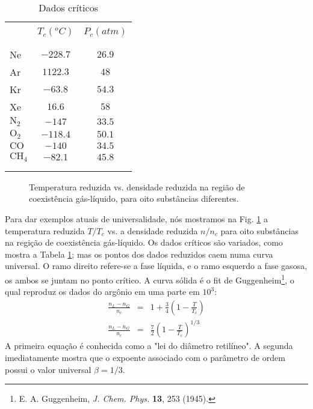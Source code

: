 \begin{table}[h]
\renewcommand{\tablename}{{\bf Tabela}}
\caption{Dados críticos}
\begin{center}
\vspace{0.2cm}
\begin{tabular}{l c c}
\hline
\\[-0.3cm]
 & $T_{c} (^{o}C)$ & $P_{c} (atm)$\\
\\[-0.4cm]
\hline
\\[-0.3cm]
Ne & $-228.7$ & $26.9$\\
Ar & $1122.3$ & $48$\\
Kr & $-63.8$ & $54.3$\\
Xe & $16.6$ & $58$\\
$\text{N}_{2}$ & $-147$ & $33.5$\\
$\text{O}_{2}$ & $-118.4$ & $50.1$\\
$\text{CO}$ & $-140$ & $34.5$\\
$\text{CH}_{4}$ & $-82.1$ & $45.8$\\
\\[-0.3cm]
\hline\\
\end{tabular}
\end{center}
\label{dados_criticos}
\end{table}

\begin{figure}[h]
\begin{center}
\renewcommand{\figurename}{Fig.}
\caption{Temperatura reduzida vs. densidade reduzida na região de coexistência gás-líquido, para oito substâncias diferentes.}
\label{figC16_002}
\end{center}
\end{figure}

Para dar exemplos atuais de universalidade, nós mostramos na Fig. \ref{figC16_002} a temperatura reduzida $T/T_{c}$ vs. a densidade reduzida $n/n_{c}$ para oito substâncias na regição de coexistência gás-líquido. Os dados críticos são variados, como mostra a Tabela \ref{dados_criticos}; mas os pontos dos dados reduzidos caem numa curva universal. O ramo direito refere-se a fase líquida, e o ramo esquerdo a fase gasosa, os ambos se juntam no ponto crítico. A curva sólida é o fit de Guggenheim\footnote{E. A. Guggenheim, {\it J. Chem. Phys.} {\bf 13}, 253 (1945).}, o qual reproduz os dados do argônio em uma parte em $10^{3}$:
\begin{eqnarray}
\frac{n_{L}-n_{G}}{n_{c}}&=&1+\frac{3}{4}\left(1-\frac{T}{T_{c}}\right)
\nonumber \\
\frac{n_{L}-n_{G}}{n_{c}}&=&\frac{7}{2}\left(1-\frac{T}{T_{c}}\right)^{1/3}
\end{eqnarray}
A primeira equação é conhecida como a "lei do diâmetro retilíneo". A segunda imediatamente mostra que o expoente associado com o parâmetro de ordem possui o valor universal $\beta=1/3$.

